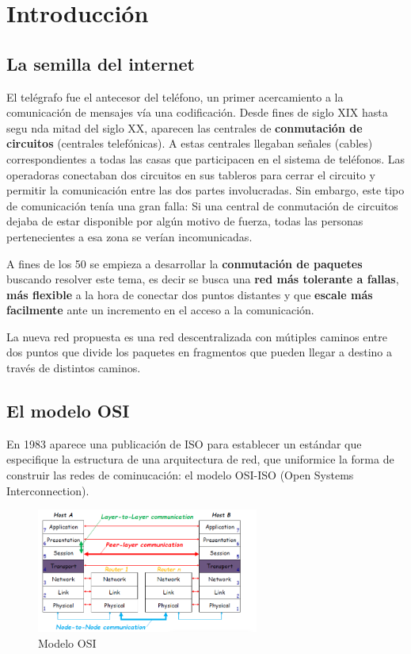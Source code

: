 \section{Introducción}
\subsection{La semilla del internet}  
El telégrafo fue el antecesor del teléfono, un primer acercamiento a la comunicación de
mensajes vía una codificación. Desde fines de siglo XIX hasta segu  nda mitad del siglo XX,
aparecen las centrales de \textbf{conmutación de circuitos} (centrales telefónicas). A estas centrales
llegaban señales (cables) correspondientes a todas las casas que participacen en el sistema de
teléfonos. Las operadoras conectaban dos circuitos en sus tableros para cerrar el circuito y
permitir la comunicación entre las dos partes involucradas. Sin embargo, este tipo de comunicación tenía una gran falla: Si una central de conmutación de circuitos
dejaba de estar disponible por algún motivo de fuerza, todas las personas pertenecientes a esa
zona se verían incomunicadas.


A fines de los 50 se empieza a desarrollar la \textbf{conmutación de paquetes} buscando resolver este tema, es decir se busca una \textbf{red más tolerante a fallas}, \textbf{más flexible} a la hora de conectar dos puntos distantes y que \textbf{escale más facilmente} ante un incremento en el acceso a la comunicación.

La nueva red propuesta es una red descentralizada con mútiples caminos entre dos puntos que divide los paquetes en fragmentos que pueden llegar a destino a través de distintos caminos.

\subsection*{El modelo OSI}
En 1983 aparece una publicación de ISO para establecer un estándar que especifique la estructura de una arquitectura de red, que uniformice la forma de construir las redes de cominucación: el modelo OSI-ISO (Open Systems Interconnection).

\begin{figure}[h]
	\centering
	\includegraphics[width=0.65\textwidth
]{images/osi.png}
	\caption[Modelo OSI de Referencia]{Modelo OSI}
	\label{fig:osi}
\end{figure}


